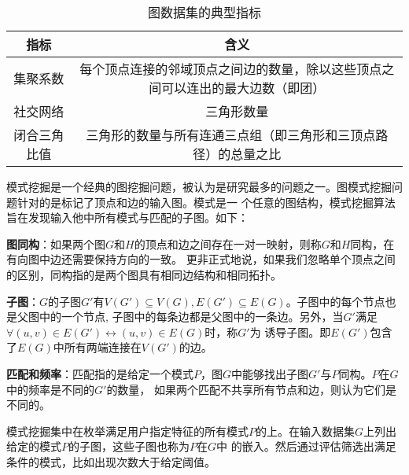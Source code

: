 \documentclass[master]{thesis-uestc}
\begin{document}
\begin{table}
    \label{tab:graph-parameter}
   \caption{图数据集的典型指标}
   \begin{tabular}{|c|c|}
    \hline
    指标 & 含义\\
    \hline
    集聚系数 &  每个顶点连接的邻域顶点之间边的数量，除以这些顶点之间可以连出的最大边数（即团）\\
    \hline
    社交网络 & 三角形数量 \\
    \hline
    闭合三角比值 & 三角形的数量与所有连通三点组（即三角形和三顶点路径）的总量之比\\
    \hline
   \end{tabular} 
\end{table}

    模式挖掘是一个经典的图挖掘问题，被认为是研究最多的问题之一。图模式挖掘问题针对的是标记了顶点和边的输入图。模式是一
个任意的图结构，模式挖掘算法旨在发现输入他中所有模式与匹配的子图。如下：

    \textbf{图同构}：如果两个图$G$和$H$的顶点和边之间存在一对一映射，则称$G$和$H$同构，在有向图中边还需要保持方向的一致。
更非正式地说，如果我们忽略单个顶点之间的区别，同构指的是两个图具有相同边结构和相同拓扑。
    
    \textbf{子图}：$G$的子图$G'$有$V(G') \subseteq V(G), E(G') \subseteq E(G)$。子图中的每个节点也是父图中的一个节点,
子图中的每条边都是父图中的一条边。另外，当$G'$满足$\forall (u,v) \in E(G') \leftrightarrow (u,v) \in E(G)$时，称$G'$为
诱导子图。即$E(G')$包含了$E(G)$中所有两端连接在$V(G')$的边。

    \textbf{匹配和频率}：匹配指的是给定一个模式$P$，图$G$中能够找出子图$G'$与$P$同构。$P$在$G$中的频率是不同的$G'$的数量，
如果两个匹配不共享所有节点和边，则认为它们是不同的。
    
    模式挖掘集中在枚举满足用户指定特征的所有模式$P$的上。在输入数据集$G$上列出给定的模式$P$的子图，这些子图也称为$P$在$G$中
的嵌入。然后通过评估筛选出满足条件的模式，比如出现次数大于给定阈值。
\end{document}
